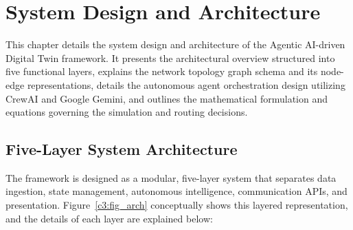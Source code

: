 \chapter{System Design and Architecture}

This chapter details the system design and architecture of the Agentic AI-driven Digital Twin framework. It presents the architectural overview structured into five functional layers, explains the network topology graph schema and its node-edge representations, details the autonomous agent orchestration design utilizing CrewAI and Google Gemini, and outlines the mathematical formulation and equations governing the simulation and routing decisions.

\section{Five-Layer System Architecture}
The framework is designed as a modular, five-layer system that separates data ingestion, state management, autonomous intelligence, communication APIs, and presentation. Figure~\ref{c3:fig_arch} conceptually shows this layered representation, and the details of each layer are explained below:

